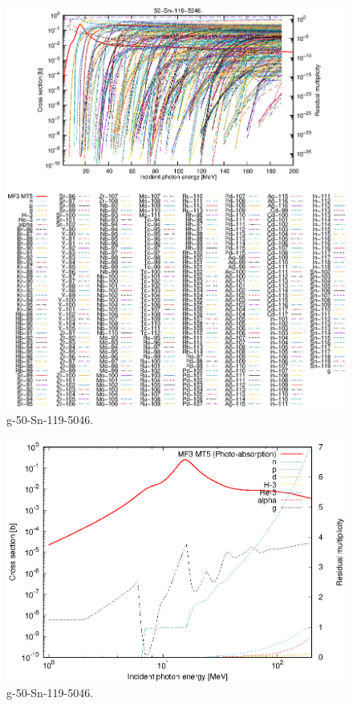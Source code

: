 \begin{figure}
 \includegraphics[width=\linewidth]{eps/g_50-Sn-119_5046.eps}
  \caption{g-50-Sn-119-5046.}
\end{figure}
\newpage \clearpage

\begin{figure}
 \includegraphics[width=\linewidth]{eps-log/g_50-Sn-119_5046.eps}
 \caption{g-50-Sn-119-5046.}
\end{figure}
\newpage \clearpage

